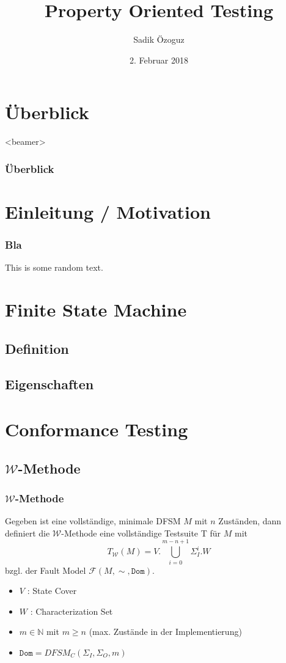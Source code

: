 \documentclass[10pt]{beamer}
\title{Property Oriented Testing}
\author{Sadik Özoguz}
\institute{Universit{\"a}t Bremen}
\date[02.02.2018]{2. Februar 2018}
\newcommand{\W}{\mathcal{W}}
\newcommand{\F}{\mathcal{F}}
\begin{document}
\begin{frame}
  \titlepage
\end{frame}

\section*{Überblick}
\begin{frame}<beamer>
  \frametitle{Überblick}
  \tableofcontents
\end{frame}

\section{Einleitung / Motivation}

\begin{frame}
  \frametitle{Bla}
  This is some random text.
\end{frame}

\section{Finite State Machine}
\subsection{Definition}
\subsection{Eigenschaften}

\section{Conformance Testing}
\subsection{$\W$-Methode}
\begin{frame}
  \frametitle{$\W$-Methode}
  \begin{definition}[$\W$-Methode]
  Gegeben ist eine vollständige, minimale DFSM $M$ mit $n$ Zuständen, dann definiert die $\W$-Methode eine vollständige Testsuite T für $M$ mit
  $$T_\W(M) = V.\bigcup\limits_{i=0}^{m-n+1}\Sigma_I^i.W$$
  bzgl. der Fault Model $\F(M, \sim, \texttt{Dom})$.
  \end{definition}
  \pause
  \begin{itemize}
    \item<2-> $V$ : State Cover
    \item<3-> $W$ : Characterization Set
    \item<4-> $m \in \mathbb{N}$ mit $m \geq n$ (max. Zustände in der Implementierung)
    \item<5-> $\texttt{Dom} = DFSM_C(\Sigma_I, \Sigma_O, m)$ 
  \end{itemize}

\end{frame}
\end{document}
